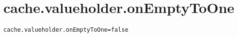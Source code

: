 \section{cache.valueholder.onEmptyToOne}
\label{configuration:CacheValueholderOnEmptyToOne}
\AvailableInJavaAndCsharp{\TODO}
\begin{lstlisting}[style=Props,caption={Usage example for \textit{cache.valueholder.onEmptyToOne}}]
cache.valueholder.onEmptyToOne=false
\end{lstlisting}